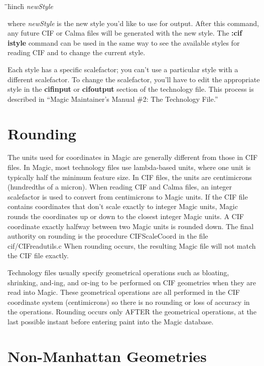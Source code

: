 \documentclass[letterpaper,twoside,12pt]{article}
\def\hinch{\hspace*{0.5in}}
\def\starti{\begin{center}\begin{tabbing}\hinch\=\hinch\=\hinch\=hinch\hinch\=\kill}
\def\endi{\end{tabbing}\end{center}}
\def\ii{\>\>\>}
\begin{document}
\starti
   \ii {\bfseries :cif ostyle} {\itshape newStyle}
\endi

where {\itshape newStyle} is the new style you'd like to use for output.
After this command, any future CIF or Calma files will be generated
with the new style.  The {\bfseries :cif istyle} command can be used
in the same way to see the available styles for reading CIF and
to change the current style.

Each style has a specific scalefactor;  you can't use a
particular style with a different scalefactor.  To change
the scalefactor, you'll have to edit the appropriate
style in the {\bfseries cifinput} or {\bfseries cifoutput} section
of the technology file.  This process is described in
``Magic Maintainer's Manual \#2: The Technology
File.''

\section{Rounding}

The units used for coordinates in Magic are generally different
from those in CIF files.  In Magic, most technology files use
lambda-based units, where one unit is typically half the minimum
feature size.  In CIF files, the units are centimicrons (hundredths
of a micron).  When
reading CIF and Calma files, an integer scalefactor is used to
convert from centimicrons to Magic units.  If the CIF file contains
coordinates that don't scale exactly to integer Magic units,
Magic rounds the coordinates up or down to the closest integer
Magic units.  A CIF coordinate exactly halfway between two Magic
units is rounded down.  The final authority on rounding is the
procedure CIFScaleCoord in the file cif/CIFreadutils.c
When rounding occurs, the resulting Magic file will
not match the CIF file exactly.

Technology files usually specify geometrical operations such as
bloating, shrinking, and-ing, and or-ing to be performed on
CIF geometries when they are read into Magic.  These geometrical
operations are all performed in the CIF coordinate system (centimicrons)
so there is no rounding or loss of accuracy in the operations.
Rounding occurs only AFTER the geometrical operations, at the last
possible instant before entering paint into the Magic database.

\section{Non-Manhattan Geometries}
\end{document}
